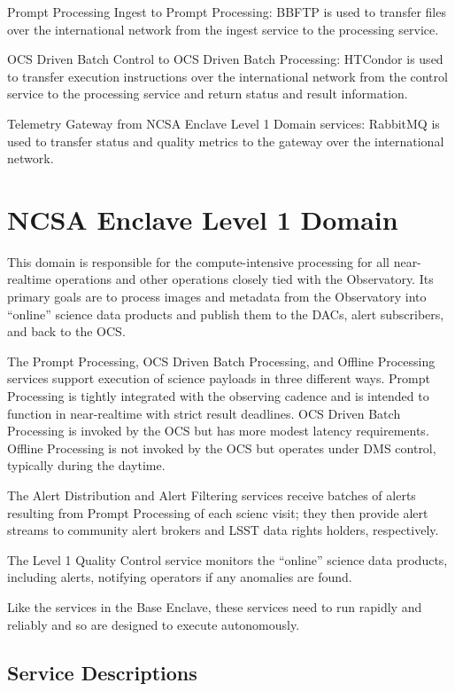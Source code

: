 \documentclass[DM,toc]{lsstdoc}
\begin{document}
Prompt Processing Ingest to Prompt Processing: BBFTP is used to transfer
files over the international network from the ingest service to the
processing service.

OCS Driven Batch Control to OCS Driven Batch Processing: HTCondor is
used to transfer execution instructions over the international network
from the control service to the processing service and return status and
result information.

Telemetry Gateway from NCSA Enclave Level 1 Domain services: RabbitMQ is
used to transfer status and quality metrics to the gateway over the
international network.

\section{NCSA Enclave Level 1 Domain}\label{ncsa-enclave-level-1-domain}

This domain is responsible for the compute-intensive processing for all
near-realtime operations and other operations closely tied with the
Observatory. Its primary goals are to process images and metadata from
the Observatory into ``online'' science data products and publish them
to the DACs, alert subscribers, and back to the OCS.

The Prompt Processing, OCS Driven Batch Processing, and Offline
Processing services support execution of science payloads in three
different ways. Prompt Processing is tightly integrated with the
observing cadence and is intended to function in near-realtime with
strict result deadlines. OCS Driven Batch Processing is invoked by the
OCS but has more modest latency requirements. Offline Processing is not
invoked by the OCS but operates under DMS control, typically during the
daytime.

The Alert Distribution and Alert Filtering services receive batches of
alerts resulting from Prompt Processing of each scienc visit; they then
provide alert streams to community alert brokers and LSST data rights
holders, respectively.

The Level 1 Quality Control service monitors the ``online'' science data
products, including alerts, notifying operators if any anomalies are
found.

Like the services in the Base Enclave, these services need to run
rapidly and reliably and so are designed to execute autonomously.

\subsection{Service Descriptions}\label{ncsa-l1-service-descriptions}
\end{document}
